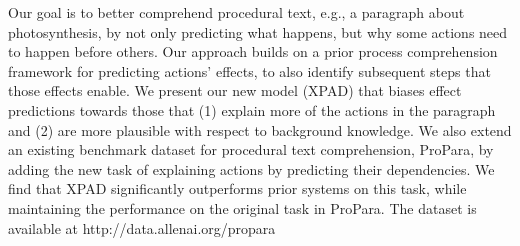 Our goal is to better comprehend procedural text, e.g., a paragraph about photosynthesis, by not only predicting what happens, but why some actions need to happen before others. Our approach builds on a prior process comprehension framework for predicting actions' effects, to also identify subsequent steps that those effects enable. We present our new model (XPAD) that biases effect predictions towards those that (1) explain more of the actions in the paragraph and (2) are more plausible with respect to background knowledge. We also extend an existing benchmark dataset for procedural text comprehension, ProPara, by adding the new task of explaining actions by predicting their dependencies. We find that XPAD significantly outperforms prior systems on this task, while maintaining the performance on the original task in ProPara. The dataset is available at http://data.allenai.org/propara
